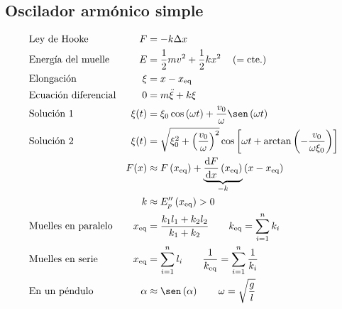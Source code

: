 \documentclass[a4paper, 8pt]{extarticle}
\begin{document}
\begin{multicols}{3}
  \section{Oscilador armónico simple}
  \begin{align*}
     & \text{Ley de Hooke}         & F             & = -k\Delta x                                                                                                                            \\
     & \text{Energía del muelle}   & E             & = \frac{1}{2}mv^2 + \frac{1}{2}kx^2 \quad \left( = \text{cte.} \right)                                                                  \\
     & \text{Elongación}           & \xi           & = x - x_{\text{eq}}                                                                                                                     \\
     & \text{Ecuación diferencial} & 0             & = m\ddot{\xi} + k\xi                                                                                                                    \\
     & \text{Solución 1}           & \xi (t)       & = \xi _0 \cos \left( \omega t \right) + \frac{v_0}{\omega} \sen \left( \omega t \right)                                                 \\
     & \text{Solución 2}           & \xi (t)       & = \sqrt{\xi_0^2 + \left( \frac{v_0}{\omega} \right)^2} \cos \left[ \omega t + \arctan \left( - \frac{v_0}{\omega \xi_0} \right) \right] \\
     & \text{}                     & F(x)          & \approx F \left( x_{\text{eq}} \right) + \underbrace{\dv{F}{x} \left( x_{\text{eq}} \right)}_{-k} \left( x - x_{\text{eq}} \right)      \\
     & \text{}                     & k             & \approx E_p''\left( x_{\text{eq}} \right) > 0                                                                                           \\
     & \text{Muelles en paralelo}  & x_{\text{eq}} & = \frac{k_1l_1 + k_2l_2}{k_1 + k_2}\qquad k_{\text{eq}} = \sum_{i=1}^{n}k_i                                                             \\
     & \text{Muelles en serie}     & x_{\text{eq}} & = \sum_{i=1}^{n}l_i \qquad \frac{1}{k_{\text{eq}}} = \sum_{i=1}^{n}\frac{1}{k_i}                                                        \\
     & \text{En un péndulo}        & \alpha        & \approx \sen \left( \alpha \right) \qquad \omega = \sqrt{\frac{g}{l}}
  \end{align*}


\end{multicols}
\end{document}

